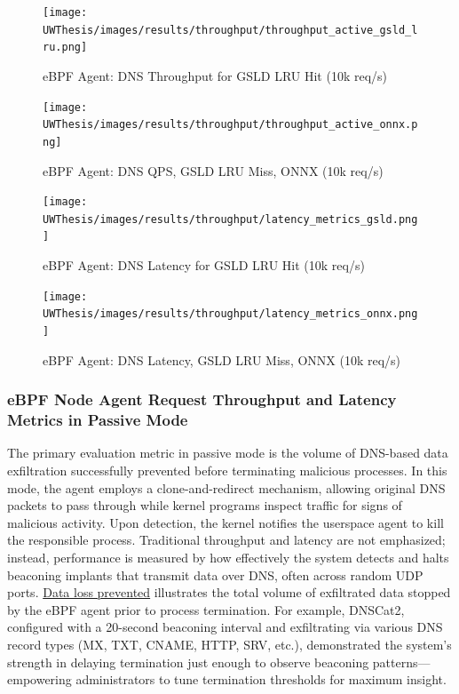 \documentclass [11pt, proquest] {uwthesis}[2020/02/24]
\begin{document}
\begin{figure}[H]
  \centering
  \begin{minipage}[t]{0.47\textwidth}
    \centering
    \texttt{[image: UWThesis/images/results/throughput/throughput\_active\_gsld\_lru.png]}
    \caption{eBPF Agent: DNS Throughput for GSLD LRU Hit (10k req/s)}
    \label{fig:throughput_gsld}
  \end{minipage}
  \hfill
  \begin{minipage}[t]{0.47\textwidth}
    \centering
    \texttt{[image: UWThesis/images/results/throughput/throughput\_active\_onnx.png]}
    \caption{eBPF Agent: DNS QPS, GSLD LRU Miss, ONNX (10k req/s)}
    \label{fig:throughput_onnx}
  \end{minipage}

  \vspace{1cm} %

  \begin{minipage}[t]{0.47\textwidth}
    \centering
    \texttt{[image: UWThesis/images/results/throughput/latency\_metrics\_gsld.png]}
    \caption{eBPF Agent: DNS Latency for GSLD LRU Hit (10k req/s)}
    \label{fig:latency_gsld}
  \end{minipage}
  \hfill
  \begin{minipage}[t]{0.47\textwidth}
    \centering
    \texttt{[image: UWThesis/images/results/throughput/latency\_metrics\_onnx.png]}
    \caption{eBPF Agent: DNS Latency, GSLD LRU Miss, ONNX (10k req/s)}
    \label{fig:latency_onnx}
  \end{minipage}
\end{figure}

\subsubsection{eBPF Node Agent Request Throughput and Latency Metrics in Passive Mode}
The primary evaluation metric in passive mode is the volume of DNS-based data exfiltration successfully prevented before terminating malicious processes. In this mode, the agent employs a clone-and-redirect mechanism, allowing original DNS packets to pass through while kernel programs inspect traffic for signs of malicious activity. Upon detection, the kernel notifies the userspace agent to kill the responsible process. Traditional throughput and latency are not emphasized; instead, performance is measured by how effectively the system detects and halts beaconing implants that transmit data over DNS, often across random UDP ports. \hyperref[fig:data_loss_prev]{Data loss prevented} illustrates the total volume of exfiltrated data stopped by the eBPF agent prior to process termination. For example, DNSCat2, configured with a 20-second beaconing interval and exfiltrating via various DNS record types (MX, TXT, CNAME, HTTP, SRV, etc.), demonstrated the system’s strength in delaying termination just enough to observe beaconing patterns—empowering administrators to tune termination thresholds for maximum insight.
\end{document}
